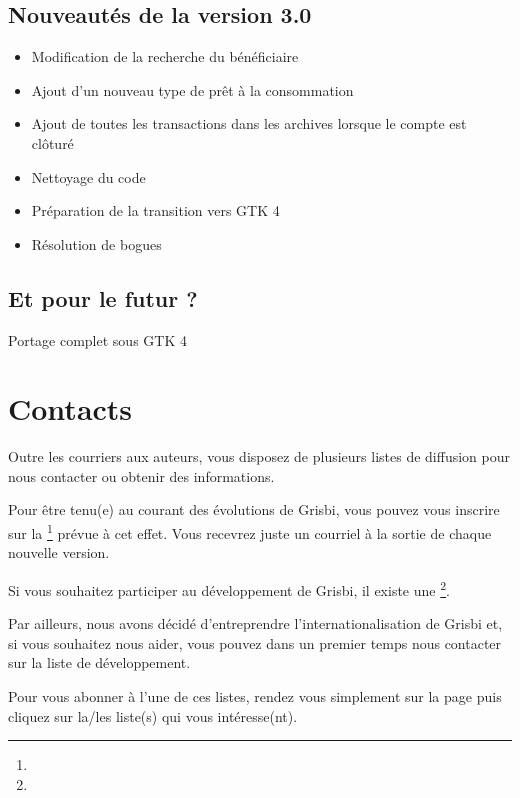 \subsection{Nouveautés de la version 3.0}

\begin{itemize}
	\item Modification de la recherche du bénéficiaire
	\item Ajout d'un nouveau type de prêt à la consommation
	\item Ajout de toutes les transactions dans les archives lorsque le compte est clôturé
	\item Nettoyage du code
	\item Préparation de la transition vers \gls{GTK} 4
	\item Résolution de bogues
\end{itemize}

\subsection{Et pour le futur ?}

Portage complet sous \gls{GTK} 4


\section{Contacts\label{introduction-contacts}} 	%


Outre les courriers aux auteurs, vous disposez de plusieurs listes de diffusion 
pour nous contacter ou obtenir des informations.

Pour être tenu(e) au courant des évolutions de Grisbi, vous pouvez vous inscrire 
sur la \footnote{\urlListInfoEmail{}} prévue à cet effet. 
Vous recevrez juste un courriel à la sortie de chaque nouvelle version.

Si vous souhaitez participer au développement de Grisbi, il existe une \footnote{\urlListDevelEmail{}}.

Par ailleurs, nous avons décidé d'entreprendre l'internationalisation de Grisbi
et, si vous souhaitez nous aider, vous pouvez dans un premier temps nous contacter sur la liste de développement.

Pour vous abonner à l'une de ces listes, rendez vous simplement sur la page
\urlListDiffGrisbi{} puis cliquez sur la/les liste(s) qui vous intéresse(nt).

